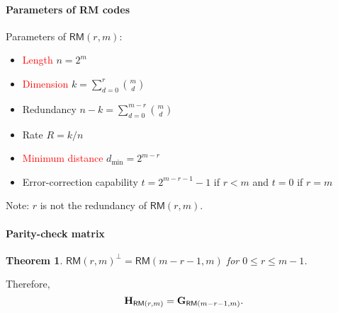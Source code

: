 \documentclass[a4paper, 11pt, openany]{book}
\numberwithin{equation}{section}
\theoremstyle{plain}
\newtheorem{theorem}	[equation]	{Theorem}
\theoremstyle{definition}
\newcommand{\dmin}{d_{\min}}
\newcommand{\Important}[1]{\textcolor{red}{#1}}
\newcommand{\Structure}[1]{\textcolor{blue}{#1}}
\newcommand{\code}[1]{\mathsf{#1}}
\newcommand{\ReedMuller}            {\code{RM}}
\begin{document}


% 


\paragraph{Parameters of RM codes}
Parameters of $\ReedMuller(r,m)$:
\begin{itemize}
	\item \Important{Length} $n = 2^m$
	\item \Important{Dimension} $k = \sum_{d=0}^r \binom{m}{d}$
	\item Redundancy $n-k = \sum_{d=0}^{m-r} \binom{m}{d}$
	\item Rate $R = k/n$
	\item \Important{Minimum distance} $\dmin = 2^{m-r}$
	\item Error-correction capability $t = 2^{m-r-1} - 1$ if $r < m$ and $t=0$ if $r=m$
\end{itemize}
Note: $r$ is not the redundancy of $\ReedMuller(r,m)$.



\paragraph{Parity-check matrix}

\begin{theorem} 
$\ReedMuller(r,m)^\perp = \ReedMuller(m-r-1,m)$ for $0 \le r \le m-1$.
\end{theorem}
Therefore,
\[
	{\bf H}_{\ReedMuller(r,m)} = {\bf G}_{\ReedMuller(m-r-1,m)}.
\]
\end{document}
